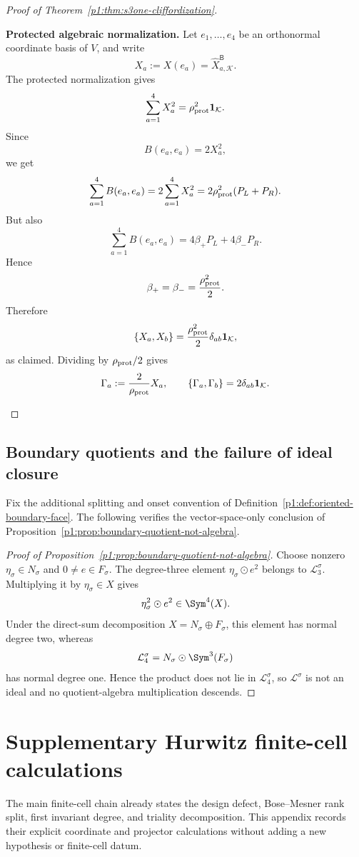 \documentclass[11pt]{article}
\begin{document}
\begin{proof}[Proof of Theorem~\ref{p1:thm:s3one-cliffordization}]
\begin{proofsteps}
\item \textbf{Protected algebraic normalization.}
Let \(e_1,\ldots,e_4\) be an orthonormal coordinate basis of \(V\), and write
\[
    X_a:=X(e_a)=\widehat X_{a,\mathcal K}^{\mathsf B}.
\]
The protected normalization gives
\[
    \sum_{a=1}^{4}X_a^2=\rho_{\rm prot}^2\mathbf1_{\mathcal K}.
\]
Since
\[
    B(e_a,e_a)=2X_a^2,
\]
we get
\[
    \sum_{a=1}^{4}B(e_a,e_a)
    =
    2\sum_{a=1}^{4}X_a^2
    =
    2\rho_{\rm prot}^2(P_L+P_R).
\]
But also
\[
    \sum_{a=1}^{4}B(e_a,e_a)
    =
    4\beta_+P_L+4\beta_-P_R.
\]
Hence
\[
    \beta_+=\beta_-=
    \frac{\rho_{\rm prot}^2}{2}.
\]
Therefore
\[
    \{X_a,X_b\}
    =
    \frac{\rho_{\rm prot}^2}{2}\delta_{ab}\mathbf1_{\mathcal K},
\]
as claimed.  Dividing by \(\rho_{\rm prot}/2\) gives
\[
    \Gamma_a:=\frac{2}{\rho_{\rm prot}}X_a,
    \qquad
    \{\Gamma_a,\Gamma_b\}=2\delta_{ab}\mathbf1_{\mathcal K}.
\]
\end{proofsteps}
\end{proof}

\subsection{Boundary quotients and the failure of ideal closure}
\label{p1:app:boundary-quotient-obstruction}
Fix the additional splitting and onset convention of
Definition~\ref{p1:def:oriented-boundary-face}.  The following verifies the
vector-space-only conclusion of
Proposition~\ref{p1:prop:boundary-quotient-not-algebra}.

\begin{proof}[Proof of Proposition~\ref{p1:prop:boundary-quotient-not-algebra}]
Choose nonzero \(\eta_\sigma\in N_\sigma\) and
\(0\ne e\in F_\sigma\).  The degree-three element
\(\eta_\sigma\odot e^2\) belongs to \(\mathcal L_3^\sigma\).  Multiplying it
by \(\eta_\sigma\in X\) gives
\[
    \eta_\sigma^2\odot e^2\in\Sym^4(X).
\]
Under the direct-sum decomposition \(X=N_\sigma\oplus F_\sigma\), this
element has normal degree two, whereas
\[
    \mathcal L_4^\sigma
    =N_\sigma\odot\Sym^3(F_\sigma)
\]
has normal degree one.  Hence the product does not lie in
\(\mathcal L_4^\sigma\), so \(\mathcal L^\sigma\) is not an ideal and no
quotient-algebra multiplication descends.
\end{proof}

\section{Supplementary Hurwitz finite-cell calculations}
\label{p1:app:hurwitz-supplementary}
The main finite-cell chain already states the design defect, Bose--Mesner rank
split, first invariant degree, and triality decomposition.  This appendix
records their explicit coordinate and projector calculations without adding a
new hypothesis or finite-cell datum.
\end{document}
